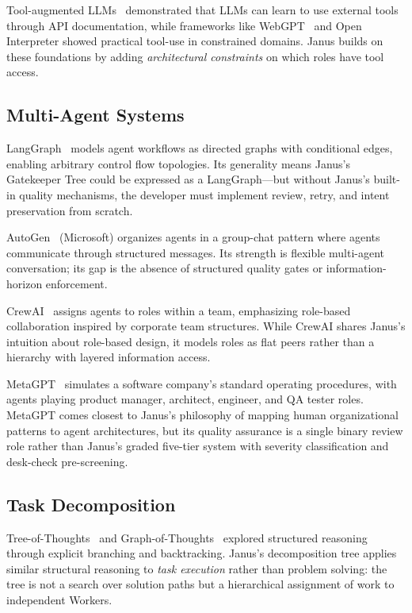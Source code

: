 \documentclass[11pt,a4paper]{article}
\begin{document}
Tool-augmented LLMs~\cite{toolformer,gorilla} demonstrated that LLMs can
learn to use external tools through API documentation, while frameworks
like WebGPT~\cite{webgpt} and Open Interpreter showed practical tool-use
in constrained domains. Janus builds on these foundations by adding
\emph{architectural constraints} on which roles have tool access.

\subsection{Multi-Agent Systems}

LangGraph~\cite{langgraph} models agent workflows as directed graphs with
conditional edges, enabling arbitrary control flow topologies. Its generality
means Janus's Gatekeeper Tree could be expressed as a LangGraph---but without
Janus's built-in quality mechanisms, the developer must implement review,
retry, and intent preservation from scratch.

AutoGen~\cite{autogen} (Microsoft) organizes agents in a group-chat pattern
where agents communicate through structured messages. Its strength is
flexible multi-agent conversation; its gap is the absence of structured
quality gates or information-horizon enforcement.

CrewAI~\cite{crewai} assigns agents to roles within a team, emphasizing
role-based collaboration inspired by corporate team structures. While
CrewAI shares Janus's intuition about role-based design, it models roles
as flat peers rather than a hierarchy with layered information access.

MetaGPT~\cite{metagpt} simulates a software company's standard operating
procedures, with agents playing product manager, architect, engineer, and
QA tester roles. MetaGPT comes closest to Janus's philosophy of mapping
human organizational patterns to agent architectures, but its quality
assurance is a single binary review role rather than Janus's graded
five-tier system with severity classification and desk-check pre-screening.

\subsection{Task Decomposition}

Tree-of-Thoughts~\cite{tot} and Graph-of-Thoughts~\cite{got} explored
structured reasoning through explicit branching and backtracking.
Janus's decomposition tree applies similar structural reasoning to
\emph{task execution} rather than problem solving: the tree is not a
search over solution paths but a hierarchical assignment of work to
independent Workers.
\end{document}
